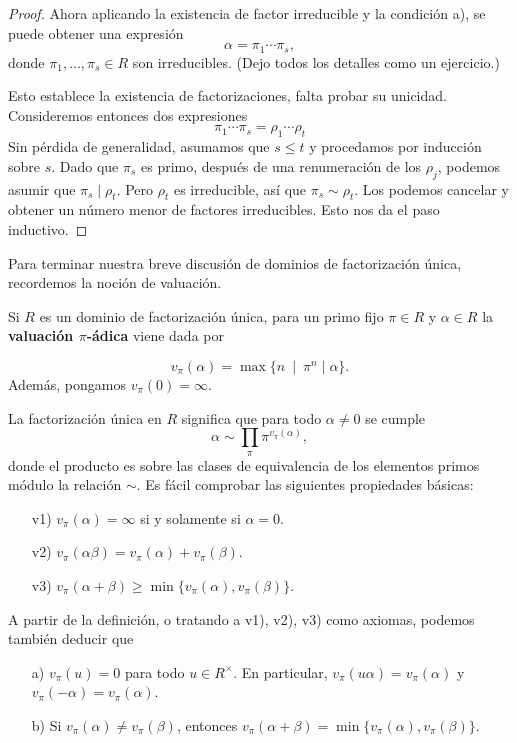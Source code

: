 \begin{teorema}
\begin{proof}
    Ahora aplicando la existencia de factor irreducible y la condición a), se
    puede obtener una expresión
    $$\alpha = \pi_1\cdots \pi_s,$$
    donde $\pi_1,\ldots,\pi_s\in R$ son irreducibles. (Dejo todos los detalles
    como un ejercicio.)

    Esto establece la existencia de factorizaciones, falta probar su
    unicidad. Consideremos entonces dos expresiones
    $$\pi_1\cdots\pi_s = \rho_1\cdots\rho_t$$
    Sin pérdida de generalidad, asumamos que $s \le t$ y procedamos por
    inducción sobre $s$. Dado que $\pi_s$ es primo, después de una renumeración
    de los $\rho_j$, podemos asumir que $\pi_s\mid\rho_t$. Pero $\rho_t$ es
    irreducible, así que $\pi_s\sim\rho_t$. Los podemos cancelar y obtener
    un número menor de factores irreducibles. Esto nos da el paso inductivo.
  \end{proof}
\end{teorema}

Para terminar nuestra breve discusión de dominios de factorización única,
recordemos la noción de valuación.

\begin{definicion}
  Si $R$ es un dominio de factorización única, para un primo fijo $\pi \in R$ y
  $\alpha \in R$ la \textbf{valuación $\pi$-ádica} viene dada por

  $$v_\pi (\alpha) = \max \{ n ~\mid~ \pi^n \mid \alpha \}.$$
  Además, pongamos $v_\pi (0) = \infty$.
\end{definicion}

La factorización única en $R$ significa que para todo $\alpha\ne 0$ se cumple
$$\alpha \sim \prod_\pi \pi^{v_\pi (\alpha)},$$ donde el producto es sobre las
clases de equivalencia de los elementos primos módulo la relación $\sim$.
Es fácil comprobar las siguientes propiedades básicas:
\begin{enumerate}
\item[v1)] $v_\pi (\alpha) = \infty$ si y solamente si $\alpha = 0$.

\item[v2)] $v_\pi (\alpha\beta) = v_\pi (\alpha) + v_\pi (\beta)$.

\item[v3)] $v_\pi (\alpha+\beta) \ge \min \{ v_\pi (\alpha), v_\pi (\beta) \}$.
\end{enumerate}
A partir de la definición, o tratando a v1), v2), v3) como axiomas, podemos
también deducir que
\begin{enumerate}
\item[a)] $v_\pi (u) = 0$ para todo $u \in R^\times$. En particular,
  $v_\pi (u\alpha) = v_\pi (\alpha)$ y $v_\pi (-\alpha) = v_\pi (\alpha)$.

\item[b)] Si $v_\pi (\alpha) \ne v_\pi (\beta)$, entonces
$v_\pi (\alpha+\beta) = \min \{ v_\pi (\alpha), v_\pi (\beta) \}$.
\end{enumerate}

